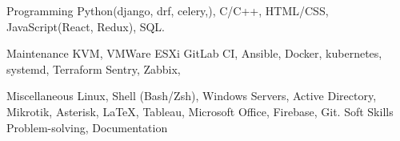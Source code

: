 

\begin{cvskills}

  \cvskill
    {Programming}
    {Python(django, drf, celery,), C/C++, HTML/CSS, JavaScript(React, Redux), SQL.} %

  \cvskill
    {Maintenance}
    {KVM, VMWare ESXi GitLab CI, Ansible, Docker, kubernetes, systemd, Terraform Sentry, Zabbix, } %

  \cvskill
    {Miscellaneous} %
    {Linux, Shell (Bash/Zsh), Windows Servers, Active Directory, Mikrotik, Asterisk, \LaTeX, Tableau, Microsoft Office, Firebase, Git.} %
  \cvskill
    {Soft Skills} %
    {Problem-solving, Documentation} %

\end{cvskills}
